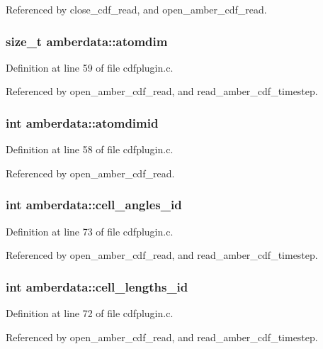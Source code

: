 Referenced by close\_\-cdf\_\-read, and open\_\-amber\_\-cdf\_\-read.
\subsubsection{\setlength{\rightskip}{0pt plus 5cm}size\_\-t amberdata::atomdim}\label{structamberdata_m2}




Definition at line 59 of file cdfplugin.c.

Referenced by open\_\-amber\_\-cdf\_\-read, and read\_\-amber\_\-cdf\_\-timestep.
\subsubsection{\setlength{\rightskip}{0pt plus 5cm}int amberdata::atomdimid}\label{structamberdata_m1}




Definition at line 58 of file cdfplugin.c.

Referenced by open\_\-amber\_\-cdf\_\-read.
\subsubsection{\setlength{\rightskip}{0pt plus 5cm}int amberdata::cell\_\-angles\_\-id}\label{structamberdata_m16}




Definition at line 73 of file cdfplugin.c.

Referenced by open\_\-amber\_\-cdf\_\-read, and read\_\-amber\_\-cdf\_\-timestep.
\subsubsection{\setlength{\rightskip}{0pt plus 5cm}int amberdata::cell\_\-lengths\_\-id}\label{structamberdata_m15}




Definition at line 72 of file cdfplugin.c.

Referenced by open\_\-amber\_\-cdf\_\-read, and read\_\-amber\_\-cdf\_\-timestep.
